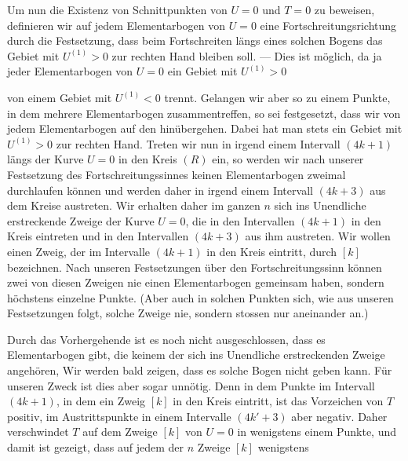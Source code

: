\par
\noindent\hspace*{\parindent}
Um nun die Existenz von Schnittpunkten von \(U=0\) und \(T=0\) zu beweisen,
definieren wir auf jedem Elementarbogen von \(U=0\) eine Fortschreitungsrichtung
durch die Festsetzung, dass beim Fortschreiten längs eines
solchen Bogens das Gebiet mit \(U^{(1)}>0\) zur rechten Hand bleiben soll. — Dies
ist möglich, da ja jeder Elementarbogen von \(U=0\) ein Gebiet mit \(U^{(1)}>0\)\par
\clearpage{}
\noindent von einem Gebiet mit \(U^{(1)}<0\) trennt. Gelangen wir aber so zu einem Punkte,
in dem mehrere Elementarbogen zusammentreffen, so sei festgesetzt, dass wir
von jedem Elementarbogen auf den  hinübergehen.
Dabei hat man stets ein Gebiet mit \(U^{(1)}>0\) zur rechten Hand. Treten wir
nun in irgend einem Intervall \((4k+1)\) längs der Kurve \(U=0\) in den Kreis
\((R)\) ein, so werden wir nach unserer Festsetzung des Fortschreitungssinnes keinen
Elementarbogen zweimal durchlaufen können und werden daher in irgend
einem Intervall \((4k+3)\) aus dem Kreise austreten. Wir erhalten daher im
ganzen \(n\) sich ins Unendliche erstreckende Zweige der Kurve \(U=0\), die in
den Intervallen \((4k+1)\) in den Kreis eintreten und in den Intervallen \((4k+3)\)
aus ihm austreten. Wir wollen einen Zweig, der im Intervalle \((4k+1)\) in
den Kreis eintritt, durch \([k]\) bezeichnen. Nach unseren Festsetzungen über
den Fortschreitungssinn können zwei von diesen Zweigen nie einen Elementarbogen
gemeinsam haben, sondern höchstens einzelne Punkte. (Aber auch in
solchen Punkten  sich, wie aus unseren Festsetzungen folgt, solche
Zweige nie, sondern stossen nur aneinander an.)
\par
Durch das Vorhergehende ist es noch nicht ausgeschlossen, dass es Elementarbogen
gibt, die keinem der sich ins Unendliche erstreckenden Zweige
angehören, Wir werden bald zeigen, dass es solche Bogen nicht geben kann.
Für unseren Zweck ist dies aber sogar unnötig. Denn in dem Punkte im
Intervall \((4k+1)\), in dem ein Zweig \([k]\) in den Kreis eintritt, ist das Vorzeichen
von \(T\) positiv, im Austrittspunkte in einem Intervalle \((4k'+3)\) aber
negativ. Daher verschwindet \(T\) auf dem Zweige \([k]\) von \(U=0\) in wenigstens
einem Punkte, und damit ist gezeigt, dass auf jedem der \(n\) Zweige \([k]\) wenigstens
